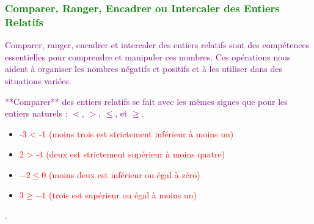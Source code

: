\documentclass{article}
\begin{document}
\vspace{0.5cm}

\begin{center}
\end{center}

\subsubsection{\textcolor{green}{Comparer, Ranger, Encadrer ou Intercaler des Entiers Relatifs}}

\textcolor{purple}{Comparer, ranger, encadrer et intercaler des entiers relatifs sont des compétences essentielles pour comprendre et manipuler ces nombres. Ces opérations nous aident à organiser les nombres négatifs et positifs et à les utiliser dans des situations variées.}

\vspace{0.35cm}

\textcolor{purple}{**Comparer** des entiers relatifs se fait avec les mêmes signes que pour les entiers naturels : \(<\), \(>\), \(\leq\), et \(\geq\).}

\vspace{0.5cm}

\begin{tcolorbox}[colback=orange!10!white, colframe=orange!75!black, title=\textcolor{white}{Exemples}, sharp corners=southwest]
\begin{itemize}
    \item \textcolor{red}{-3 < -1 (moins trois est strictement inférieur à moins un)}
    \item \textcolor{red}{2 > -4 (deux est strictement supérieur à moins quatre)}
    \item \textcolor{red}{$-2 \leq 0$ (moins deux est inférieur ou égal à zéro)}
    \item \textcolor{red}{$3 \geq -1$ (trois est supérieur ou égal à moins un)}
\end{itemize}.
\end{tcolorbox}
\end{document}
